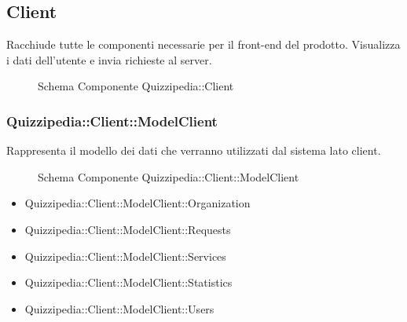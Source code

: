 \subsection{Client}
Racchiude tutte le componenti necessarie per il front-end del prodotto. Visualizza i dati dell'utente e invia richieste al server.
\begin{figure}[H]
\centering
\noindent{}
\caption{Schema Componente Quizzipedia::Client}
\end{figure}
\subsubsection{Quizzipedia::Client::ModelClient}
Rappresenta il modello dei dati che verranno utilizzati dal sistema lato client.
\begin{figure}[H]
\centering
\noindent{}
\caption{Schema Componente Quizzipedia::Client::ModelClient}
\end{figure}
\begin{itemize}
\item Quizzipedia::Client::ModelClient::Organization
\item Quizzipedia::Client::ModelClient::Requests
\item Quizzipedia::Client::ModelClient::Services
\item Quizzipedia::Client::ModelClient::Statistics
\item Quizzipedia::Client::ModelClient::Users
\end{itemize}
